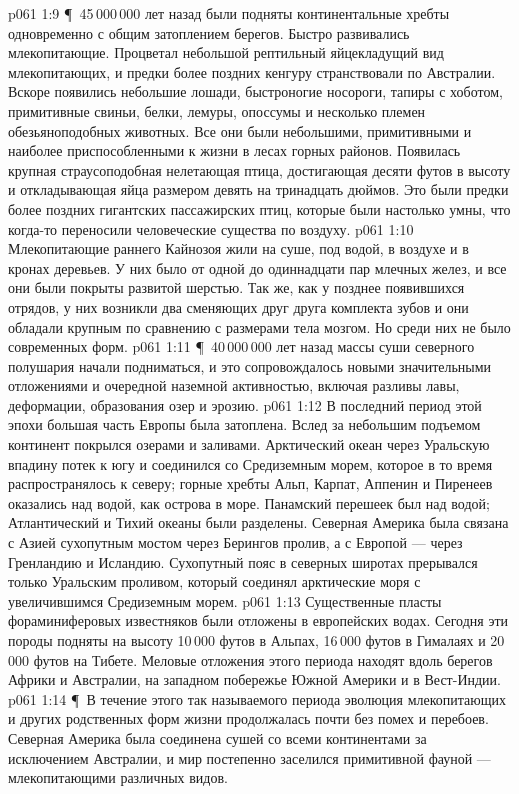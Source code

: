 \vs p061 1:9 \P\ 45\,000\,000 лет назад были подняты континентальные хребты одновременно с общим затоплением берегов. Быстро развивались млекопитающие. Процветал небольшой рептильный яйцекладущий вид млекопитающих, и предки более поздних кенгуру странствовали по Австралии. Вскоре появились небольшие лошади, быстроногие носороги, тапиры с хоботом, примитивные свиньи, белки, лемуры, опоссумы и несколько племен обезьяноподобных животных. Все они были небольшими, примитивными и наиболее приспособленными к жизни в лесах горных районов. Появилась крупная страусоподобная нелетающая птица, достигающая десяти футов в высоту и откладывающая яйца размером девять на тринадцать дюймов. Это были предки более поздних гигантских пассажирских птиц, которые были настолько умны, что когда\hyp{}то переносили человеческие существа по воздуху.
\vs p061 1:10 Млекопитающие раннего Кайнозоя жили на суше, под водой, в воздухе и в кронах деревьев. У них было от одной до одиннадцати пар млечных желез, и все они были покрыты развитой шерстью. Так же, как у позднее появившихся отрядов, у них возникли два сменяющих друг друга комплекта зубов и они обладали крупным по сравнению с размерами тела мозгом. Но среди них не было современных форм.
\vs p061 1:11 \P\ 40\,000\,000 лет назад массы суши северного полушария начали подниматься, и это сопровождалось новыми значительными отложениями и очередной наземной активностью, включая разливы лавы, деформации, образования озер и эрозию.
\vs p061 1:12 В последний период этой эпохи большая часть Европы была затоплена. Вслед за небольшим подъемом континент покрылся озерами и заливами. Арктический океан через Уральскую впадину потек к югу и соединился со Средиземным морем, которое в то время распространялось к северу; горные хребты Альп, Карпат, Аппенин и Пиренеев оказались над водой, как острова в море. Панамский перешеек был над водой; Атлантический и Тихий океаны были разделены. Северная Америка была связана с Азией сухопутным мостом через Берингов пролив, а с Европой --- через Гренландию и Исландию. Сухопутный пояс в северных широтах прерывался только Уральским проливом, который соединял арктические моря с увеличившимся Средиземным морем.
\vs p061 1:13 Существенные пласты фораминиферовых известняков были отложены в европейских водах. Сегодня эти породы подняты на высоту 10\,000 футов в Альпах, 16\,000 футов в Гималаях и 20\,000 футов на Тибете. Меловые отложения этого периода находят вдоль берегов Африки и Австралии, на западном побережье Южной Америки и в Вест\hyp{}Индии.
\vs p061 1:14 \P\ В течение этого так называемого  периода эволюция млекопитающих и других родственных форм жизни продолжалась почти без помех и перебоев. Северная Америка была соединена сушей со всеми континентами за исключением Австралии, и мир постепенно заселился примитивной фауной --- млекопитающими различных видов.
